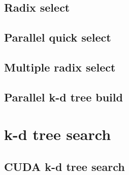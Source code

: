 \subsection{Radix select} %
\label{sec:radix_select}




 \subsection{Parallel quick select} %
 \label{sec:parallel_quick_select}





\subsection{Multiple radix select} %
\label{sec:multiple_radix_select}



\subsection{Parallel k-d tree build} %
\label{sec:paralell_k_d_tree_build}




\section{k-d tree search} %
\label{sec:k_d_tree_search}

\subsection{CUDA k-d tree search} %
\label{sec:cuda_k_d_tree_search}

